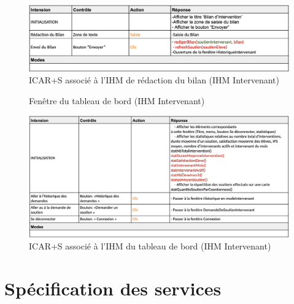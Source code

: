 \begin{figure}[H]
    \centering
    \includegraphics[width=13cm]{ICARS/redacBilan.png}
    \caption{ICAR+S associé à l'IHM de rédaction du bilan (IHM Intervenant)}
\end{figure}

\begin{figure}[H]
    \centering
    \caption{Fenêtre du tableau de bord (IHM Intervenant)}
\end{figure}

\begin{figure}[H]
    \centering
    \includegraphics[width=13cm]{ICARS/tdb.png}
    \caption{ICAR+S associé à l'IHM du tableau de bord (IHM Intervenant)}
\end{figure}

\section{Spécification des services}

